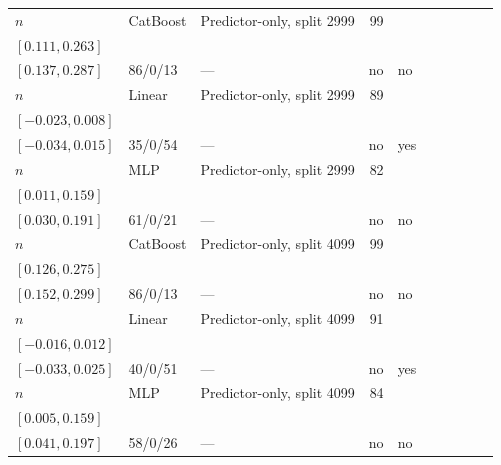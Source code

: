 \begin{longtable}{@{}ll>{\raggedright\arraybackslash}p{1.1in}rllrlll@{}}
$n$ & CatBoost & Predictor-only, split 2999 & 99 & \begin{tabular}[t]{@{}l@{}}$0.200$\\\tiny$[0.111, 0.263]$\end{tabular} & \begin{tabular}[t]{@{}l@{}}$0.216$\\\tiny$[0.137, 0.287]$\end{tabular} & 86/0/13 & --- & no & no \\
$n$ & Linear & Predictor-only, split 2999 & 89 & \begin{tabular}[t]{@{}l@{}}$-0.007$\\\tiny$[-0.023, 0.008]$\end{tabular} & \begin{tabular}[t]{@{}l@{}}$-0.006$\\\tiny$[-0.034, 0.015]$\end{tabular} & 35/0/54 & --- & no & yes \\
$n$ & MLP & Predictor-only, split 2999 & 82 & \begin{tabular}[t]{@{}l@{}}$0.074$\\\tiny$[0.011, 0.159]$\end{tabular} & \begin{tabular}[t]{@{}l@{}}$0.121$\\\tiny$[0.030, 0.191]$\end{tabular} & 61/0/21 & --- & no & no \\
$n$ & CatBoost & Predictor-only, split 4099 & 99 & \begin{tabular}[t]{@{}l@{}}$0.223$\\\tiny$[0.126, 0.275]$\end{tabular} & \begin{tabular}[t]{@{}l@{}}$0.226$\\\tiny$[0.152, 0.299]$\end{tabular} & 86/0/13 & --- & no & no \\
$n$ & Linear & Predictor-only, split 4099 & 91 & \begin{tabular}[t]{@{}l@{}}$-0.005$\\\tiny$[-0.016, 0.012]$\end{tabular} & \begin{tabular}[t]{@{}l@{}}$-0.003$\\\tiny$[-0.033, 0.025]$\end{tabular} & 40/0/51 & --- & no & yes \\
$n$ & MLP & Predictor-only, split 4099 & 84 & \begin{tabular}[t]{@{}l@{}}$0.098$\\\tiny$[0.005, 0.159]$\end{tabular} & \begin{tabular}[t]{@{}l@{}}$0.119$\\\tiny$[0.041, 0.197]$\end{tabular} & 58/0/26 & --- & no & no \\

\end{longtable}
